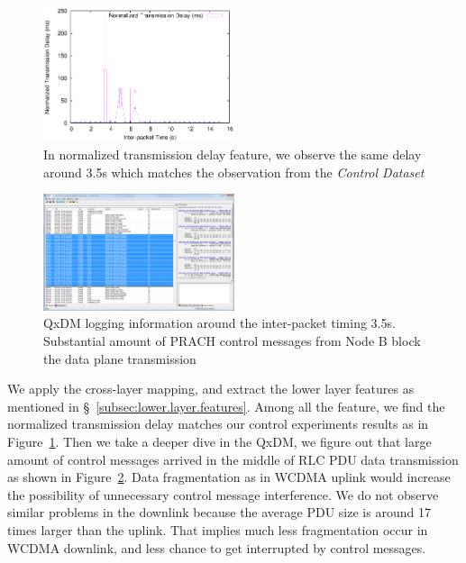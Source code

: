 \begin{figure}[t!]
\centering
\includegraphics[width=0.5\textwidth]{figs/normalized_transmission_delay.eps}
\caption{In normalized transmission delay feature, we observe the same delay around 3.5s which matches the observation from the \emph{Control Dataset}} 
\label{fig:rlc.normalized.transmission.delay}
\end{figure}

\begin{figure}[t!]
\centering
\includegraphics[width=0.5\textwidth]{figs/root_cause_rrc_message_blocking.png}
\caption{QxDM logging information around the inter-packet timing 3.5s. Substantial amount of PRACH control messages from Node B block the data plane transmission} 
\label{fig:qxdm.root.cause}
\end{figure}

We apply the cross-layer mapping, and extract the lower layer features as mentioned in \S~\ref{subsec:lower.layer.features}. Among all the feature, we find the normalized transmission delay matches our control experiments results as in Figure~\ref{fig:rlc.normalized.transmission.delay}. Then we take a deeper dive in the QxDM, we figure out that large amount of control messages arrived in the middle of RLC PDU data transmission as shown in Figure~\ref{fig:qxdm.root.cause}. Data fragmentation as in WCDMA uplink would increase the possibility of unnecessary control message interference. We do not observe similar problems in the downlink because the average PDU size is around 17 times larger than the uplink. That implies much less fragmentation occur in WCDMA downlink, and less chance to get interrupted by control messages.



